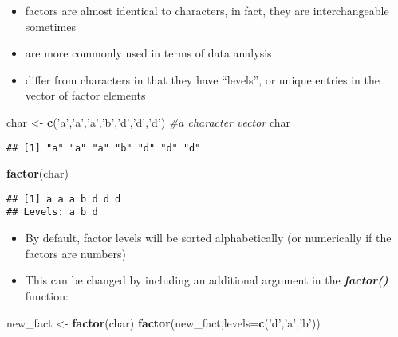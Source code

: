 \documentclass[]{article}
\newenvironment{Shaded}{\begin{snugshade}}{\end{snugshade}}
\newcommand{\KeywordTok}[1]{\textcolor[rgb]{0.13,0.29,0.53}{\textbf{{#1}}}}
\newcommand{\DataTypeTok}[1]{\textcolor[rgb]{0.13,0.29,0.53}{{#1}}}
\newcommand{\StringTok}[1]{\textcolor[rgb]{0.31,0.60,0.02}{{#1}}}
\newcommand{\CommentTok}[1]{\textcolor[rgb]{0.56,0.35,0.01}{\textit{{#1}}}}
\newcommand{\NormalTok}[1]{{#1}}
\providecommand{\tightlist}{%
  \setlength{\itemsep}{0pt}\setlength{\parskip}{0pt}}
\begin{document}
\begin{itemize}
\tightlist
\item
  factors are almost identical to characters, in fact, they are
  interchangeable sometimes
\item
  are more commonly used in terms of data analysis
\item
  differ from characters in that they have ``levels'', or unique entries
  in the vector of factor elements
\end{itemize}

\begin{Shaded}
\begin{Highlighting}[]
\NormalTok{char <-}\StringTok{ }\KeywordTok{c}\NormalTok{(}\StringTok{'a'}\NormalTok{,}\StringTok{'a'}\NormalTok{,}\StringTok{'a'}\NormalTok{,}\StringTok{'b'}\NormalTok{,}\StringTok{'d'}\NormalTok{,}\StringTok{'d'}\NormalTok{,}\StringTok{'d'}\NormalTok{) }\CommentTok{#a character vector}
\NormalTok{char}
\end{Highlighting}
\end{Shaded}

\begin{verbatim}
## [1] "a" "a" "a" "b" "d" "d" "d"
\end{verbatim}

\begin{Shaded}
\begin{Highlighting}[]
\KeywordTok{factor}\NormalTok{(char)}
\end{Highlighting}
\end{Shaded}

\begin{verbatim}
## [1] a a a b d d d
## Levels: a b d
\end{verbatim}

\begin{itemize}
\tightlist
\item
  By default, factor levels will be sorted alphabetically (or
  numerically if the factors are numbers)
\item
  This can be changed by including an additional argument in the
  \textbf{\emph{factor()}} function:
\end{itemize}

\begin{Shaded}
\begin{Highlighting}[]
\NormalTok{new_fact <-}\StringTok{ }\KeywordTok{factor}\NormalTok{(char)}
\KeywordTok{factor}\NormalTok{(new_fact,}\DataTypeTok{levels=}\KeywordTok{c}\NormalTok{(}\StringTok{'d'}\NormalTok{,}\StringTok{'a'}\NormalTok{,}\StringTok{'b'}\NormalTok{))}
\end{Highlighting}
\end{Shaded}
\end{document}
